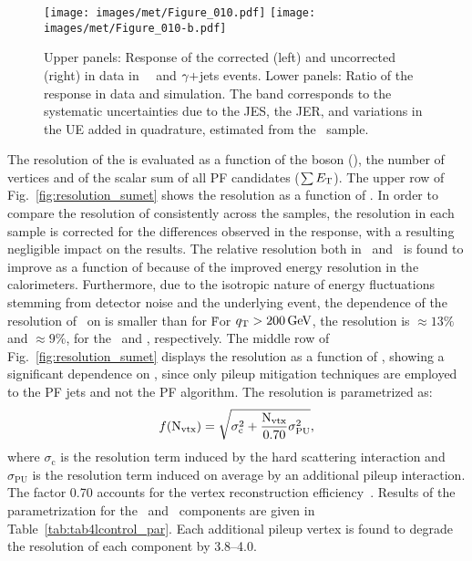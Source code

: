 \begin{figure}[!htp]
  \centering
   \texttt{[image: images/met/Figure\_010.pdf]}
   \texttt{[image: images/met/Figure\_010-b.pdf]}
  \caption{Upper panels: Response of the corrected (left) and uncorrected (right) \ptmiss in data in \Zmm\, \Zee\, and $\gamma+$jets events.  
Lower panels: Ratio of the \ptmiss response in data and simulation. 
The band corresponds to the systematic uncertainties due to the JES, the JER, and variations in the UE added in quadrature, estimated from the \Zee\ sample.}
  \label{fig:response}
\end{figure}
The resolution of the \ptmiss is evaluated as a function of the boson \pt (\qt), the number of vertices and of the scalar \pt sum of all PF candidates ($\sum E_{\mathrm{T}}$).
The upper row of Fig.~\ref{fig:resolution_sumet} shows the resolution as a function of \qt. 
In order to compare the resolution of \ptmiss consistently across the samples, the resolution in each sample is corrected for the differences observed in the response, with a resulting negligible impact on the results. 
The relative resolution both in \upar\ and \uperp\ is found to improve as a function of \qt because of the improved energy resolution in the calorimeters. 
Furthermore, due to the isotropic nature of energy fluctuations stemming from detector noise and the underlying event, the dependence of the resolution of \uperp\ on \qt is smaller than for \upar\. 
For ${q}_{\mathrm T}>200\,\text{Ge\hspace{-.08em}V}$, the \ptmiss resolution is $\approx 13\%$ and $\approx 9\%$, for the \upar\ and \uperp, respectively.
The middle row of Fig.~\ref{fig:resolution_sumet} displays the resolution as a function of \nvtx, showing a significant dependence on \nvtx, 
since only pileup mitigation techniques are employed to the PF jets and not the PF \ptmiss algorithm. 
The resolution is parametrized as:
\begin{equation} \label{eq:npv}
f(\mathrm{N}_{\mathrm{vtx}}) = \sqrt{\sigma_{\mathrm{c}}^2 + \frac{\mathrm{N}_{\mathrm{vtx}}}{0.70}\sigma_{\mathrm{\mathrm{PU}}}^2},
\end{equation}
where $\sigma_{\mathrm{c}}$ is the resolution term induced by the hard scattering interaction and $\sigma_{\mathrm{\mathrm{PU}}}$ is the resolution term induced on average by an additional pileup interaction. 
The factor 0.70 accounts for the vertex reconstruction efficiency~\cite{CMS-DP-2017-015}. 
Results of the parametrization for the \upar\ and \uperp\ components are given in Table~\ref{tab:tab4lcontrol_par}. Each additional pileup vertex is found to degrade the resolution of each component by 3.8--4.0\GeV.

